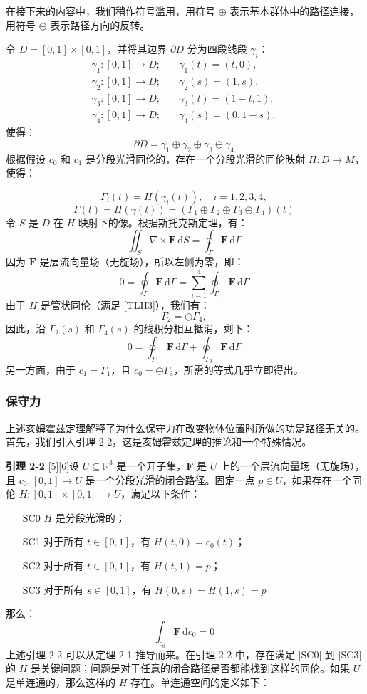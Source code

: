 在接下来的内容中，我们稍作符号滥用，用符号 \(\oplus\) 表示基本群体中的路径连接，用符号 \(\ominus\) 表示路径方向的反转。

令 \(D = [0, 1] \times [0, 1]\)，并将其边界 \(\partial D\) 分为四段线段 \(\gamma_i\)：
\[
\begin{aligned}
\gamma_1: [0, 1] \to D; &\quad \gamma_1(t) = (t, 0), \\
\gamma_2: [0, 1] \to D; &\quad \gamma_2(s) = (1, s), \\
\gamma_3: [0, 1] \to D; &\quad \gamma_3(t) = (1 - t, 1), \\
\gamma_4: [0, 1] \to D; &\quad \gamma_4(s) = (0, 1 - s),
\end{aligned}~
\]
使得：
\[
\partial D = \gamma_1 \oplus \gamma_2 \oplus \gamma_3 \oplus \gamma_4~
\]
根据假设 \(c_0\) 和 \(c_1\) 是分段光滑同伦的，存在一个分段光滑的同伦映射 \(H: D \to M\)，使得：

\[
\Gamma_i(t) = H(\gamma_i(t)), \quad i = 1, 2, 3, 4,~
\]
\[
\Gamma(t) = H(\gamma(t)) = (\Gamma_1 \oplus \Gamma_2 \oplus \Gamma_3 \oplus \Gamma_4)(t)~
\]
令 \(S\) 是 \(D\) 在 \(H\) 映射下的像。根据斯托克斯定理，有：
\[
\iint_S \nabla \times \mathbf{F} \, \mathrm{d}S = \oint_\Gamma \mathbf{F} \, \mathrm{d}\Gamma~
\]
因为 \(\mathbf{F}\) 是层流向量场（无旋场），所以左侧为零，即：
\[
0 = \oint_\Gamma \mathbf{F} \, \mathrm{d}\Gamma = \sum_{i=1}^{4} \oint_{\Gamma_i} \mathbf{F} \, \mathrm{d}\Gamma~
\]
由于 \(H\) 是管状同伦（满足 [TLH3]），我们有：
\[
\Gamma_2 = \ominus \Gamma_4,~
\]
因此，沿 \(\Gamma_2(s)\) 和 \(\Gamma_4(s)\) 的线积分相互抵消，剩下：
\[
0 = \oint_{\Gamma_1} \mathbf{F} \, \mathrm{d}\Gamma + \oint_{\Gamma_3} \mathbf{F} \, \mathrm{d}\Gamma~
\]
另一方面，由于 \(c_1 = \Gamma_1\)，且 \(c_0 = \ominus \Gamma_3\)，所需的等式几乎立即得出。
\subsubsection{保守力}
上述亥姆霍兹定理解释了为什么保守力在改变物体位置时所做的功是路径无关的。首先，我们引入引理 2-2，这是亥姆霍兹定理的推论和一个特殊情况。

\textbf{引理 2-2} [5][6]设 \(U \subseteq \mathbb{R}^3\) 是一个开子集，\(\mathbf{F}\) 是 \(U\) 上的一个层流向量场（无旋场），且 \(c_0: [0, 1] \to U\) 是一个分段光滑的闭合路径。固定一点 \(p \in U\)，如果存在一个同伦 \(H: [0, 1] \times [0, 1] \to U\)，满足以下条件：

\begin{itemize}
\item [SC0] \(H\) 是分段光滑的；
\item [SC1] 对于所有 \(t \in [0, 1]\)，有 \(H(t, 0) = c_0(t)\)；
\item [SC2] 对于所有 \(t \in [0, 1]\)，有 \(H(t, 1) = p\)；
\item [SC3] 对于所有 \(s \in [0, 1]\)，有 \(H(0, s) = H(1, s) = p\)
\end{itemize}
那么：
\[
\int_{c_0} \mathbf{F} \, \mathrm{d}c_0 = 0~
\]
上述引理 2-2 可以从定理 2-1 推导而来。在引理 2-2 中，存在满足 [SC0] 到 [SC3] 的 \(H\) 是关键问题；问题是对于任意的闭合路径是否都能找到这样的同伦。如果 \(U\) 是单连通的，那么这样的 \(H\) 存在。单连通空间的定义如下：

